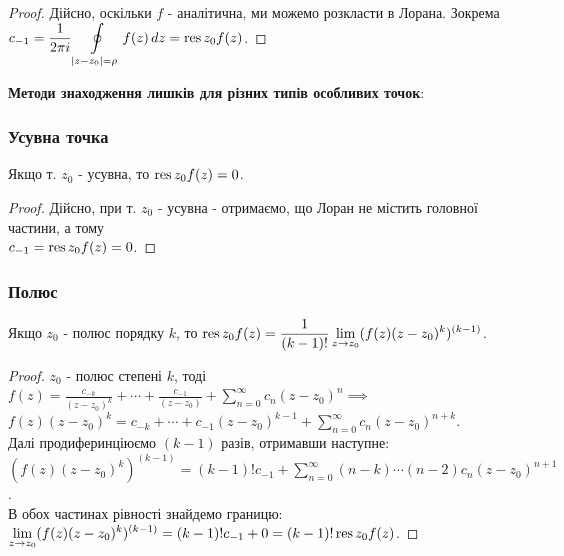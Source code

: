 \documentclass{math_library}
\begin{document}
\begin{proof}
Дійсно, оскільки $f$ - аналітична, ми можемо розкласти в Лорана. Зокрема \\
$\displaystyle c_{-1} = \frac{1}{2 \pi i} \oint\displaylimits_{|z-z_0|=\rho} f(z) \,dz = \operatorname*{res}{z_0}{f(z)}$.
\end{proof}


\textbf{Методи знаходження лишків для різних типів особливих точок}:
\subsubsection{Усувна точка}
\begin{lemma}
Якщо т. $z_0$ - усувна, то $\operatorname*{res}{z_0}{f(z)} = 0$.
\end{lemma}

\begin{proof}
Дійсно, при т. $z_0$ - усувна - отримаємо, що Лоран не містить головної частини, а тому \\ $c_{-1}=\operatorname*{res}{z_0}{f(z)} = 0$.
\end{proof}

\subsubsection{Полюс}
\begin{theorem}
Якщо $z_0$ - полюс порядку $k$, то $\displaystyle \operatorname*{res}{z_0}{f(z)} = \frac{1}{(k-1)!} \lim_{z \to z_0} (f(z)(z-z_0)^k)^{(k-1)}$.
\end{theorem}

\begin{proof}
$z_0$ - полюс степені $k$, тоді\\
$\displaystyle f(z) = \frac{c_{-k}}{(z-z_0)^k} + \cdots + \frac{c_{-1}}{(z-z_0)} + \sum_{n=0}^{\infty} c_n(z-z_0)^n \implies$\\
$\displaystyle f(z)(z-z_0)^k = c_{-k} + \cdots + c_{-1}(z-z_0)^{k-1} + \sum_{n=0}^{\infty} c_n(z-z_0)^{n+k}$.\\
Далі продиферинціюємо $(k-1)$ разів, отримавши наступне:\\
$\displaystyle (f(z)(z-z_0)^k)^{(k-1)} = (k-1)!c_{-1} + \sum_{n=0}^{\infty} (n-k)\cdots(n-2)c_n(z-z_0)^{n+1}$.\\
В обох частинах рівності знайдемо границю:\\
$\displaystyle \lim_{z \to z_0} (f(z)(z-z_0)^k)^{(k-1)} = (k-1)!c_{-1}+0 = (k-1)! \operatorname*{res}{z_0}{f(z)}$.
\end{proof}
\end{document}
